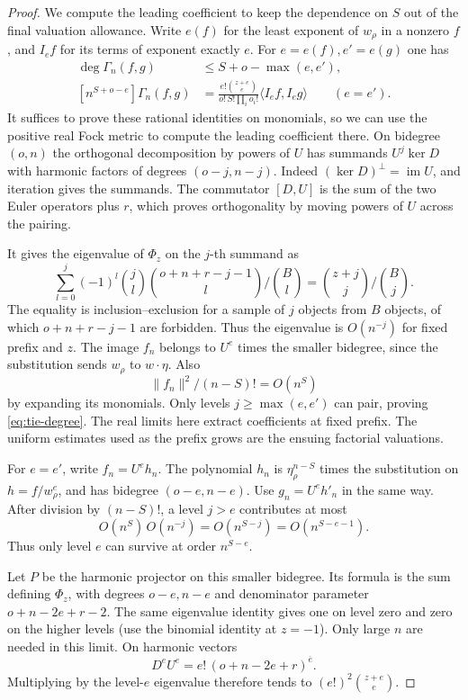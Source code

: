 \begin{proof}
We compute the leading coefficient to keep the dependence on
\(S\) out of the final valuation allowance. Write \(e(f)\) for
the least exponent of \(w_\rho\) in a nonzero \(f\), and \(I_e f\)
for its terms of exponent exactly \(e\). For
\(e=e(f),e'=e(g)\) one has
\begin{align}
 \deg\Gamma_n(f,g)&\le S+o-\max(e,e'),\label{eq:tie-degree}\\
 {}[n^{S+o-e}]\Gamma_n(f,g)
   &=\frac{e!\binom{z+e}{e}}{o!\,S!\prod_i o_i!}
                   \langle I_e f,I_e g\rangle
                      \qquad(e=e').\label{eq:tie-top}
\end{align}
It suffices to prove these rational identities on monomials,
so we can use the positive real Fock metric to compute the
leading coefficient there. On bidegree \((o,n)\) the orthogonal
decomposition by powers of \(U\) has summands \(U^j\ker D\)
with harmonic factors of degrees \((o-j,n-j)\). Indeed
\((\ker D)^\perp=\operatorname{im}U\), and iteration gives the
summands. The commutator \([D,U]\) is the sum of the two Euler
operators plus \(r\), which proves orthogonality by moving powers
of \(U\) across the pairing.

It gives the eigenvalue of
\(\Phi_z\) on the \(j\)-th summand as
\[
 \sum_{l=0}^j (-1)^l\binom jl
       \binom{o+n+r-j-1}{l}/\binom Bl
      =\binom{z+j}{j}/\binom Bj .
\]
The equality is inclusion--exclusion for a sample of \(j\)
objects from \(B\) objects, of which \(o+n+r-j-1\) are forbidden.
Thus the eigenvalue is \(O(n^{-j})\) for fixed prefix and \(z\).
The image \(f_n\) belongs to \(U^e\) times the smaller bidegree,
since the substitution sends \(w_\rho\) to \(w\cdot\eta\).
Also
\[
 \|f_n\|^2/(n-S)!=O(n^S)
\]
by expanding its monomials.
Only levels \(j\ge\max(e,e')\) can pair, proving
\eqref{eq:tie-degree}. The real limits here extract coefficients
at fixed prefix. The uniform estimates used as the prefix grows
are the ensuing factorial valuations.

For \(e=e'\), write \(f_n=U^e h_n\). The polynomial \(h_n\)
is \(\eta_\rho^{n-S}\) times the substitution on
\(h=f/w_\rho^e\), and has bidegree \((o-e,n-e)\).
Use \(g_n=U^e h'_n\) in the same way. After division by \((n-S)!\), a level \(j>e\) contributes at most
\[
 O(n^{S})\,O(n^{-j})=O(n^{S-j})=O(n^{S-e-1}).
\]
Thus only level \(e\) can survive at order \(n^{S-e}\).

Let \(P\) be the harmonic projector on this smaller bidegree.
Its formula is the sum defining \(\Phi_z\), with degrees
\(o-e,n-e\) and denominator parameter \(o+n-2e+r-2\).
The same eigenvalue identity gives one on level zero and zero
on the higher levels (use the binomial identity at \(z=-1\)).
Only large \(n\) are needed in this limit. On harmonic vectors
\[
 D^eU^e=e!\,(o+n-2e+r)^{\overline e}.
\]
Multiplying by the level-\(e\) eigenvalue therefore tends to
\((e!)^2\binom{z+e}{e}\).


\end{proof}
